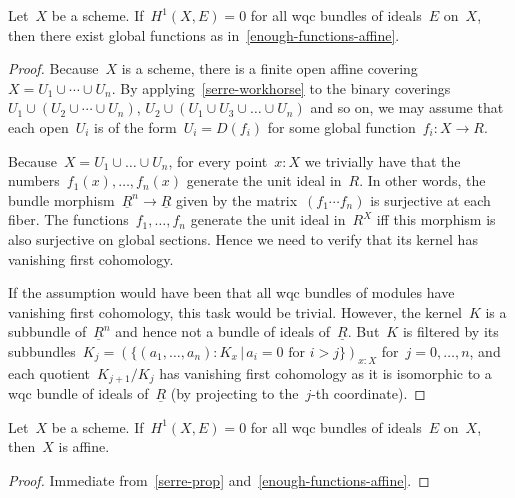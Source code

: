 \begin{proposition}\label{serre-prop}
  Let~$X$ be a scheme. If~$H^1(X, E) = 0$ for all wqc bundles of ideals~$E$ on~$X$, then
  there exist global functions as in~\cref{enough-functions-affine}.
\end{proposition}

\begin{proof}
  Because~$X$ is a scheme, there is a finite open affine covering~$X = U_1 \cup
  \cdots \cup U_n$. By applying~\cref{serre-workhorse} to the binary
  coverings~$U_1 \cup (U_2 \cup \cdots \cup U_n)$, $U_2 \cup (U_1 \cup U_3 \cup
  \ldots \cup U_n)$ and so on, we may assume that each open~$U_i$ is of the
  form~$U_i = D(f_i)$ for some global function~$f_i : X \to R$.

  Because~$X = U_1 \cup \dots \cup U_n$, for every point~$x : X$ we trivially
  have that the numbers~$f_1(x),\ldots,f_n(x)$ generate the unit ideal in~$R$.
  In other words, the bundle morphism~$\underline{R}^n \to \underline{R}$ given by
  the matrix~$(f_1 \cdots f_n)$ is surjective at each fiber. The
  functions~$f_1,\ldots,f_n$ generate the unit ideal in~$R^X$ iff this morphism
  is also surjective on global sections. Hence we need to verify that its
  kernel has vanishing first cohomology.

  If the assumption would have been that all wqc bundles of modules have
  vanishing first cohomology, this task would be trivial. However, the
  kernel~$K$ is a subbundle of~$\underline{R}^n$ and hence not a bundle of
  ideals of~$\underline{R}$. But~$K$ is filtered by its subbundles~$K_j = (\{
  (a_1,\ldots,a_n) : K_x \,|\, \text{$a_i = 0$ for~$i > j$} \})_{x:X}$ for~$j =
  0,\ldots,n$, and each quotient~$K_{j+1}/K_j$ has vanishing first cohomology
  as it is isomorphic to a wqc bundle of ideals of~$\underline{R}$ (by
  projecting to the~$j$-th coordinate).
\end{proof}

\begin{theorem}
  Let~$X$ be a scheme. If~$H^1(X, E) = 0$ for all wqc bundles of ideals~$E$
  on~$X$, then~$X$ is affine.
\end{theorem}

\begin{proof}
  Immediate from~\cref{serre-prop} and~\cref{enough-functions-affine}.
\end{proof}
